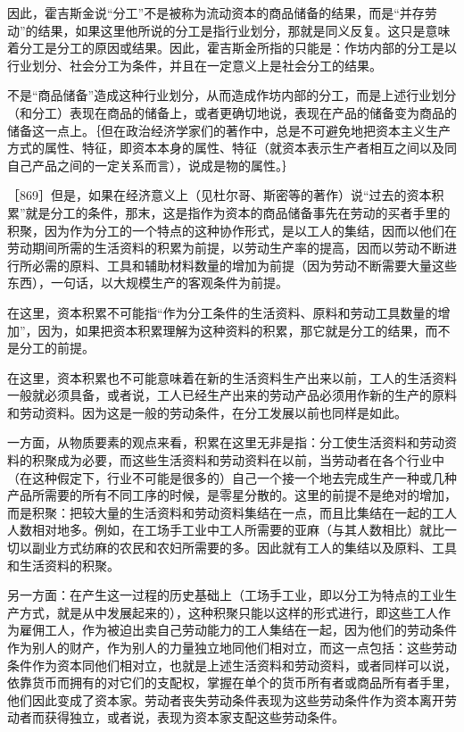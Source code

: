 因此，霍吉斯金说“分工”不是被称为流动资本的商品储备的结果，而是“并存劳动”的结果，如果这里他所说的分工是指行业划分，那就是同义反复。这只是意味着分工是分工的原因或结果。因此，霍吉斯金所指的只能是：作坊内部的分工是以行业划分、社会分工为条件，并且在一定意义上是社会分工的结果。

不是“商品储备”造成这种行业划分，从而造成作坊内部的分工，而是上述行业划分（和分工）表现在商品的储备上，或者更确切地说，表现在产品的储备变为商品的储备这一点上。｛但在政治经济学家们的著作中，总是不可避免地把资本主义生产方式的属性、特征，即资本本身的属性、特征（就资本表示生产者相互之间以及同自己产品之间的一定关系而言），说成是物的属性。｝

［869］但是，如果在经济意义上（见杜尔哥、斯密等的著作）说“过去的资本积累”就是分工的条件，那末，这是指作为资本的商品储备事先在劳动的买者手里的积聚，因为作为分工的一个特点的这种协作形式，是以工人的集结，因而以他们在劳动期间所需的生活资料的积累为前提，以劳动生产率的提高，因而以劳动不断进行所必需的原料、工具和辅助材料数量的增加为前提（因为劳动不断需要大量这些东西），一句话，以大规模生产的客观条件为前提。

在这里，资本积累不可能指“作为分工条件的生活资料、原料和劳动工具数量的增加”，因为，如果把资本积累理解为这种资料的积累，那它就是分工的结果，而不是分工的前提。

在这里，资本积累也不可能意味着在新的生活资料生产出来以前，工人的生活资料一般就必须具备，或者说，工人已经生产出来的劳动产品必须用作新的生产的原料和劳动资料。因为这是一般的劳动条件，在分工发展以前也同样是如此。

一方面，从物质要素的观点来看，积累在这里无非是指：分工使生活资料和劳动资料的积聚成为必要，而这些生活资料和劳动资料在以前，当劳动者在各个行业中（在这种假定下，行业不可能是很多的）自己一个接一个地去完成生产一种或几种产品所需要的所有不同工序的时候，是零星分散的。这里的前提不是绝对的增加，而是积聚：把较大量的生活资料和劳动资料集结在一点，而且比集结在一起的工人人数相对地多。例如，在工场手工业中工人所需要的亚麻（与其人数相比）就比一切以副业方式纺麻的农民和农妇所需要的多。因此就有工人的集结以及原料、工具和生活资料的积聚。

另一方面：在产生这一过程的历史基础上（工场手工业，即以分工为特点的工业生产方式，就是从中发展起来的），这种积聚只能以这样的形式进行，即这些工人作为雇佣工人，作为被迫出卖自己劳动能力的工人集结在一起，因为他们的劳动条件作为别人的财产，作为别人的力量独立地同他们相对立，而这一点包括：这些劳动条件作为资本同他们相对立，也就是上述生活资料和劳动资料，或者同样可以说，依靠货币而拥有的对它们的支配权，掌握在单个的货币所有者或商品所有者手里，他们因此变成了资本家。劳动者丧失劳动条件表现为这些劳动条件作为资本离开劳动者而获得独立，或者说，表现为资本家支配这些劳动条件。

